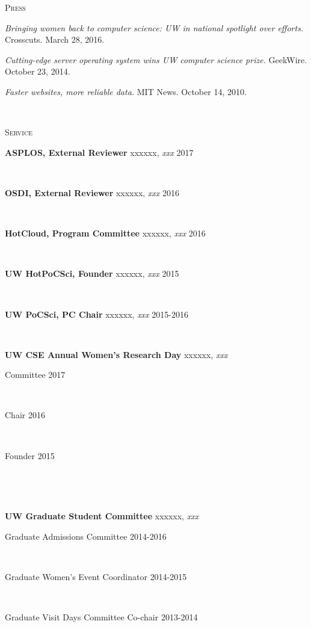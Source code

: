 \documentclass[10pt,times]{report}
\newlength{\sectiongap}
\newlength{\entrygap}
\newlength{\sectioncolwidth}
\newlength{\colgap}
\newlength{\stuffwidth}
\def\ifEqString#1#2{\def\testa{#1}\def\testb{#2}%
  \ifx\testa\testb}
\newenvironment{rtable}{
  \begin{minipage}{\textwidth}
  }{
  \end{minipage}
}
\newenvironment{rentry}[3][xxx]{
  \begin{minipage}[t]{\hsize}
    \textbf{#2}\ifEqString{#1}{xxx}\relax\else, \textit{#1}\fi
    \hspace{\stretch{1}} #3 \\
  }{
    \removelastskip
  \end{minipage}
  \\[\entrygap]  %
}
\newcommand{\rline}[2]{
  \begin{minipage}[t]{\hsize}
    #1 \hspace{\stretch{1}} #2
  \end{minipage} \\
}
\newenvironment{rsection}[1]{
  \begin{minipage}[t]{\sectioncolwidth}
    \textsc{#1}
  \end{minipage}
  \hspace{\colgap}
  \begin{minipage}[t]{\stuffwidth}
  }{
    \removelastskip
  \end{minipage}
  \\[\sectiongap]
}
\begin{document}
\begin{rtable}
  \begin{rsection}{Press}
    \textit{Bringing women back to computer science: UW in national
      spotlight over efforts.} Crosscuts. March 28, 2016.\\\vspace{-0.5em}

    \textit{Cutting-edge server operating system wins UW computer
      science prize.} GeekWire. October 23, 2014.\\\vspace{-0.5em}

    \textit{Faster websites, more reliable data.}
    MIT News. October 14, 2010.\\
  \end{rsection}
  \begin{rsection}{Service}
    \begin{rentry}{ASPLOS, External Reviewer}{2017}
       \vspace{-0.5em}
    \end{rentry}
    \begin{rentry}{OSDI, External Reviewer}{2016}
       \vspace{-0.5em}
    \end{rentry}
    \begin{rentry}{HotCloud, Program Committee}{2016}
       \vspace{-0.5em}
    \end{rentry}
    \begin{rentry}{UW HotPoCSci, Founder}{2015}
       \vspace{-0.5em}
    \end{rentry}
    \begin{rentry}{UW PoCSci, PC Chair}{2015-2016}
       \vspace{-0.5em}
    \end{rentry}
    \begin{rentry}{UW CSE Annual Women's Research Day}{}
      \rline{Committee}{2017}
      \rline{Chair}{2016}
      \rline{Founder}{2015}
       \vspace{-0.5em}
    \end{rentry}
    \begin{rentry}{UW Graduate Student Committee}{}
      \rline{Graduate Admissions Committee}{2014-2016}
      \rline{Graduate Women's Event Coordinator}{2014-2015}
      \rline{Graduate Visit Days Committee Co-chair}{2013-2014}
      \vspace{-0.5em}
    \end{rentry}

\end{rsection}
\end{rtable}
\end{document}
